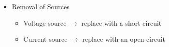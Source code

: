 \begin{itemize}
\begin{itemize}
\begin{itemize}
        \end{itemize}

      \item Removal of Sources

        \begin{itemize}

          \item Voltage source $\to$ replace with a short-circuit

          \item Current source $\to$ replace with an open-circuit

        \end{itemize}

    \end{itemize}

\end{itemize}



